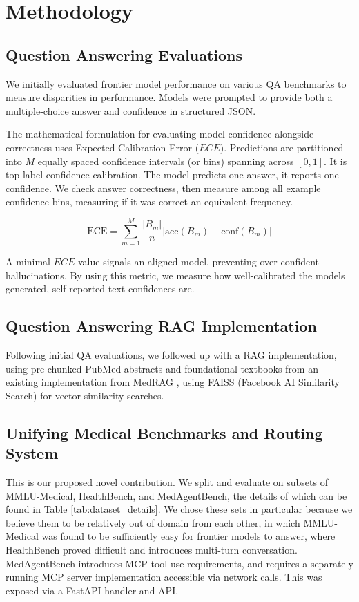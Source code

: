 \documentclass[conference]{IEEEtran}
\begin{document}
\section{Methodology}

\subsection{Question Answering Evaluations}

We initially evaluated frontier model performance on various QA benchmarks to measure disparities in performance. Models were prompted to provide both a multiple-choice answer and confidence in structured JSON.

The mathematical formulation for evaluating model confidence alongside correctness uses Expected Calibration Error ($ECE$). Predictions are partitioned into $M$ equally spaced confidence intervals (or bins) spanning across $[0, 1]$. It is top-label confidence calibration. The model predicts one answer, it reports one confidence. We check answer correctness, then measure among all example confidence bins, measuring if it was correct an equivalent frequency.

\[
\text{ECE} = \sum_{m=1}^{M} \frac{|B_m|}{n} \left| \text{acc}(B_m) - \text{conf}(B_m) \right|
\]

A minimal $ECE$ value signals an aligned model, preventing over-confident hallucinations. By using this metric, we measure how well-calibrated the models generated, self-reported text confidences are. 

\subsection{Question Answering RAG Implementation}

Following initial QA evaluations, we followed up with a RAG implementation, using pre-chunked PubMed abstracts and foundational textbooks from an existing implementation from MedRAG \cite{xiong2024benchmarkingretrievalaugmentedgenerationmedicine}, using FAISS (Facebook AI Similarity Search) \cite{douze2024faiss} for vector similarity searches.

\subsection{Unifying Medical Benchmarks and Routing System}

This is our proposed novel contribution. We split and evaluate on subsets of MMLU-Medical, HealthBench, and MedAgentBench, the details of which can be found in Table \ref{tab:dataset_details}. We chose these sets in particular because we believe them to be relatively out of domain from each other, in which MMLU-Medical was found to be sufficiently easy for frontier models to answer, where HealthBench proved difficult and introduces multi-turn conversation. MedAgentBench introduces MCP tool-use requirements, and requires a separately running MCP server implementation accessible via network calls. This was exposed via a FastAPI handler and API.
\end{document}
